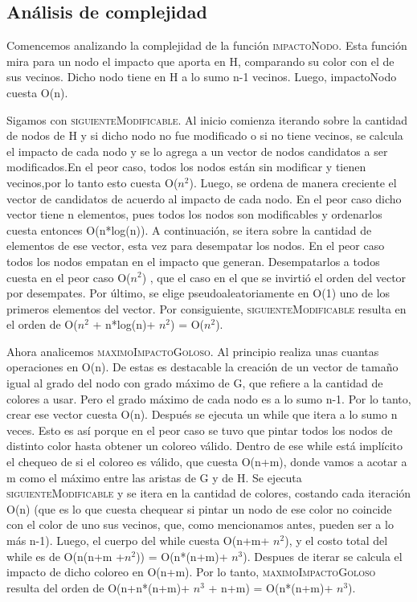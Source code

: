 \quad


\subsection{Análisis de complejidad}

\indent Comencemos analizando la complejidad de la función \textsc{impactoNodo}.
Esta función mira para un nodo el impacto que aporta en H, comparando su color con el de sus vecinos. Dicho nodo tiene en H a lo sumo n-1 vecinos. Luego, impactoNodo cuesta O(n).

\indent Sigamos con \textsc{siguienteModificable}. Al inicio comienza iterando sobre la cantidad de nodos de H y si dicho nodo no fue modificado o si no tiene vecinos, se calcula el impacto de cada nodo y se lo agrega a un vector de nodos candidatos a ser modificados.En el peor caso, todos los nodos están sin modificar y tienen vecinos,por lo tanto esto cuesta O($n^{2}$).
Luego, se ordena de manera creciente el vector de candidatos de acuerdo al impacto de cada nodo. En el peor caso dicho vector tiene n elementos, pues todos los nodos son modificables y ordenarlos cuesta entonces O(n*log(n)).
A continuaci\'on, se itera sobre la cantidad de elementos de ese vector, esta vez para desempatar los nodos. En el peor caso todos los nodos empatan en el impacto que generan. Desempatarlos a todos cuesta en el peor caso O($n^{2}$) , que el caso en el que se invirtió el orden del vector por desempates.
Por \'ultimo, se elige pseudoaleatoriamente en O(1) uno de los primeros elementos del vector.
Por consiguiente, \textsc{siguienteModificable} resulta en el orden de O($n^2$ + n*log(n)+ $n^2$) = O($n^{2}$).

\indent Ahora analicemos \textsc{maximoImpactoGoloso}.
Al principio realiza unas cuantas operaciones en O(n). 
De estas es destacable la creación de un vector de tamaño igual al grado del nodo con grado máximo de G, que refiere a la cantidad de colores a usar. 
Pero el grado máximo de cada nodo es a lo sumo n-1. 
Por lo tanto, crear ese vector cuesta O(n).
Despu\'es se ejecuta un while que itera a lo sumo n veces. 
Esto es as\'i porque en el peor caso se tuvo que pintar todos los nodos de distinto color hasta obtener un coloreo válido. 
Dentro de ese while está implícito el chequeo de si el coloreo es válido, que cuesta O(n+m), donde vamos a acotar a m como el máximo entre las aristas de G y de H. 
Se ejecuta \textsc{siguienteModificable} y se itera en la cantidad de colores, costando cada iteración O(n) (que es lo que cuesta chequear si pintar un nodo de ese color no coincide con el color de uno sus vecinos, que, como mencionamos antes, pueden ser a lo m\'as n-1).
Luego, el cuerpo del while cuesta O(n+m+ $n^{2}$), y el costo total del while es de O(n(n+m +$n^{2}$)) = O(n*(n+m)+ $n^{3}$).
Despues de iterar se calcula el impacto de dicho coloreo en O(n+m).
Por lo tanto, \textsc{maximoImpactoGoloso} resulta del orden de O(n+n*(n+m)+ $n^{3}$ + n+m) = O(n*(n+m)+ $n^{3}$).
 
